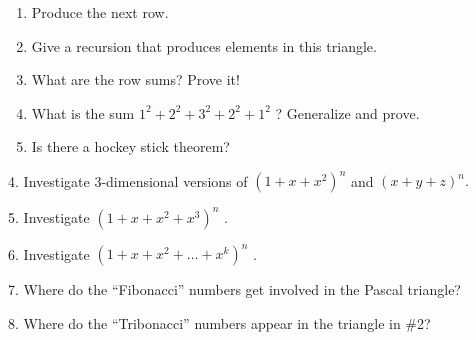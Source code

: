 \documentclass[10pt,]{book}
\theoremstyle{plain}
\theoremstyle{definition}
\theoremstyle{definition}
\numberwithin{equation}{chapter}
\begin{document}
\begin{exerciselist}
\begin{enumerate}[label=(\alph*)]
\item\hypertarget{li-63}{}\hypertarget{p-229}{}%
Produce the next row.%
\item\hypertarget{li-64}{}\hypertarget{p-230}{}%
Give a recursion that produces elements in this triangle.%
\item\hypertarget{li-65}{}\hypertarget{p-231}{}%
What are the row sums? Prove it!%
\item\hypertarget{li-66}{}\hypertarget{p-232}{}%
What is the sum \(1^{2} + 2^{2} + 3^{2} + 2^{2} + 1^{2}\) ? Generalize and prove.%
\item\hypertarget{li-67}{}\hypertarget{p-233}{}%
Is there a hockey stick theorem?%
\end{enumerate}
%
\par\smallskip
\item[4.]\hypertarget{exercise-94}{}\hypertarget{p-234}{}%
Investigate 3-dimensional versions of \(\left( 1 + x + x^{2} \right)^{n}\) and \(\left( x + y + z \right)^{n}.\)%
\par\smallskip
\item[5.]\hypertarget{exercise-95}{}\hypertarget{p-235}{}%
Investigate \(\left( 1 + x + x^{2} + x^{3} \right)^{n}\) .%
\par\smallskip
\item[6.]\hypertarget{exercise-96}{}\hypertarget{p-236}{}%
Investigate \(\left( 1 + x + x^{2} + \ldots + x^{k} \right)^{n}\) .%
\par\smallskip
\item[7.]\hypertarget{exercise-97}{}\hypertarget{p-237}{}%
Where do the ``Fibonacci'' numbers get involved in the Pascal triangle?%
\par\smallskip
\item[8.]\hypertarget{exercise-98}{}\hypertarget{p-238}{}%
Where do the ``Tribonacci'' numbers appear in the triangle in \#2?%
\par\smallskip
\end{exerciselist}
\typeout{************************************************}
\typeout{************************************************}
\end{document}
